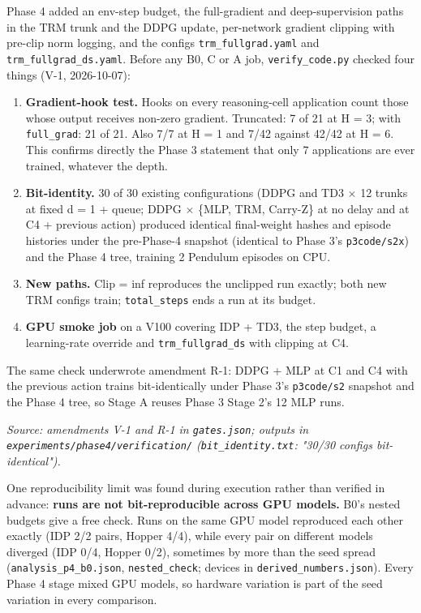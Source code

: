 \documentclass[11pt]{article}
\begin{document}
Phase 4 added an env-step budget, the full-gradient and deep-supervision paths in the TRM trunk and the DDPG update, per-network gradient clipping with pre-clip norm logging, and the configs \texttt{trm\_\allowbreak{}fullgrad.\allowbreak{}yaml} and \texttt{trm\_\allowbreak{}fullgrad\_\allowbreak{}ds.\allowbreak{}yaml}. Before any B0, C or A job, \texttt{verify\_\allowbreak{}code.\allowbreak{}py} checked four things (V-1, 2026-10-07):



\begin{enumerate}
\item \textbf{Gradient-hook test.} Hooks on every reasoning-cell application count those whose output receives non-zero gradient. Truncated: 7 of 21 at H = 3; with \texttt{full\_grad}: 21 of 21. Also 7/7 at H = 1 and 7/42 against 42/42 at H = 6. This confirms directly the Phase 3 statement that only 7 applications are ever trained, whatever the depth.
\item \textbf{Bit-identity.} 30 of 30 existing configurations (DDPG and TD3 $\times$ 12 trunks at fixed d = 1 + queue; DDPG $\times$ \{MLP, TRM, Carry-Z\} at no delay and at C4 + previous action) produced identical final-weight hashes and episode histories under the pre-Phase-4 snapshot (identical to Phase 3's \texttt{p3code/s2x}) and the Phase 4 tree, training 2 Pendulum episodes on CPU.
\item \textbf{New paths.} Clip = inf reproduces the unclipped run exactly; both new TRM configs train; \texttt{total\_steps} ends a run at its budget.
\item \textbf{GPU smoke job} on a V100 covering IDP + TD3, the step budget, a learning-rate override and \texttt{trm\_\allowbreak{}fullgrad\_\allowbreak{}ds} with clipping at C4.
\end{enumerate}



The same check underwrote amendment R-1: DDPG + MLP at C1 and C4 with the previous action trains bit-identically under Phase 3's \texttt{p3code/s2} snapshot and the Phase 4 tree, so Stage A reuses Phase 3 Stage 2's 12 MLP runs.



\emph{Source: amendments V-1 and R-1 in \texttt{gates.json}; outputs in \texttt{experiments/\allowbreak{}phase4/\allowbreak{}verification/\allowbreak{}} (\texttt{bit\_\allowbreak{}identity.\allowbreak{}txt}: "30/30 configs bit-identical").}



One reproducibility limit was found during execution rather than verified in advance: \textbf{runs are not bit-reproducible across GPU models.} B0's nested budgets give a free check. Runs on the same GPU model reproduced each other exactly (IDP 2/2 pairs, Hopper 4/4), while every pair on different models diverged (IDP 0/4, Hopper 0/2), sometimes by more than the seed spread (\texttt{analysis\_\allowbreak{}p4\_\allowbreak{}b0.\allowbreak{}json}, \texttt{nested\_check}; devices in \texttt{derived\_\allowbreak{}numbers.\allowbreak{}json}). Every Phase 4 stage mixed GPU models, so hardware variation is part of the seed variation in every comparison.
\end{document}
